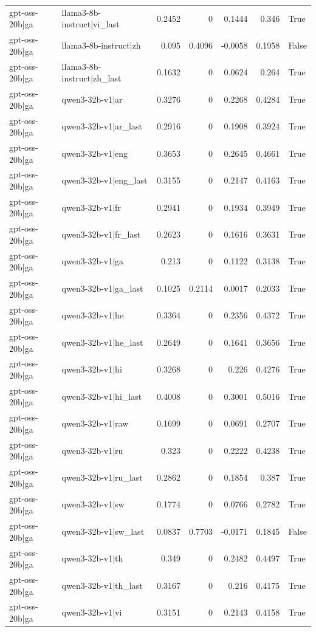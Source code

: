 \begin{table}
\begin{tabular}{l l r r r r l}
gpt-oss-20b|ga & llama3-8b-instruct|vi_last & 0.2452 & 0 & 0.1444 & 0.346 & True \\
gpt-oss-20b|ga & llama3-8b-instruct|zh & 0.095 & 0.4096 & -0.0058 & 0.1958 & False \\
gpt-oss-20b|ga & llama3-8b-instruct|zh_last & 0.1632 & 0 & 0.0624 & 0.264 & True \\
gpt-oss-20b|ga & qwen3-32b-v1|ar & 0.3276 & 0 & 0.2268 & 0.4284 & True \\
gpt-oss-20b|ga & qwen3-32b-v1|ar_last & 0.2916 & 0 & 0.1908 & 0.3924 & True \\
gpt-oss-20b|ga & qwen3-32b-v1|eng & 0.3653 & 0 & 0.2645 & 0.4661 & True \\
gpt-oss-20b|ga & qwen3-32b-v1|eng_last & 0.3155 & 0 & 0.2147 & 0.4163 & True \\
gpt-oss-20b|ga & qwen3-32b-v1|fr & 0.2941 & 0 & 0.1934 & 0.3949 & True \\
gpt-oss-20b|ga & qwen3-32b-v1|fr_last & 0.2623 & 0 & 0.1616 & 0.3631 & True \\
gpt-oss-20b|ga & qwen3-32b-v1|ga & 0.213 & 0 & 0.1122 & 0.3138 & True \\
gpt-oss-20b|ga & qwen3-32b-v1|ga_last & 0.1025 & 0.2114 & 0.0017 & 0.2033 & True \\
gpt-oss-20b|ga & qwen3-32b-v1|he & 0.3364 & 0 & 0.2356 & 0.4372 & True \\
gpt-oss-20b|ga & qwen3-32b-v1|he_last & 0.2649 & 0 & 0.1641 & 0.3656 & True \\
gpt-oss-20b|ga & qwen3-32b-v1|hi & 0.3268 & 0 & 0.226 & 0.4276 & True \\
gpt-oss-20b|ga & qwen3-32b-v1|hi_last & 0.4008 & 0 & 0.3001 & 0.5016 & True \\
gpt-oss-20b|ga & qwen3-32b-v1|raw & 0.1699 & 0 & 0.0691 & 0.2707 & True \\
gpt-oss-20b|ga & qwen3-32b-v1|ru & 0.323 & 0 & 0.2222 & 0.4238 & True \\
gpt-oss-20b|ga & qwen3-32b-v1|ru_last & 0.2862 & 0 & 0.1854 & 0.387 & True \\
gpt-oss-20b|ga & qwen3-32b-v1|sw & 0.1774 & 0 & 0.0766 & 0.2782 & True \\
gpt-oss-20b|ga & qwen3-32b-v1|sw_last & 0.0837 & 0.7703 & -0.0171 & 0.1845 & False \\
gpt-oss-20b|ga & qwen3-32b-v1|th & 0.349 & 0 & 0.2482 & 0.4497 & True \\
gpt-oss-20b|ga & qwen3-32b-v1|th_last & 0.3167 & 0 & 0.216 & 0.4175 & True \\
gpt-oss-20b|ga & qwen3-32b-v1|vi & 0.3151 & 0 & 0.2143 & 0.4158 & True \\

\end{tabular}
\end{table}
